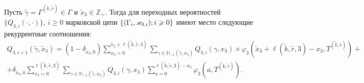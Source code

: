 \documentclass{report}
\newcommand{\MarkThree}{\{(\Gamma_i, \varkappa_{3,i}); \hm{} i \geqslant 0\}}
\begin{document}
\begin{theorem}
Пусть $\tilde{\gamma} =\Gamma^{(\tilde{k},\tilde{r})}\in \Gamma$ и $\tilde{x}_3 \in {\mathbb Z}_+$. Тогда для переходных вероятностей $\{Q_{3,i}(\cdot,\cdot)\}$, ${i\geqslant 0}$ марковской цепи $\MarkThree$ имеют место следующие рекуррентные соотношения:
\begin{multline}
Q_{3,i+1}(\tilde{\gamma},\tilde{x}_3) = (1-\delta_{\tilde{x}_3,0}) \sum_{x_3=0}^{\tilde{x}_3 +  \ell(\tilde{k},\tilde{r},3)}\sum_{\gamma \in {\mathbb H}_{-1}(\tilde{\gamma},x_3)} Q_{3,i}(\gamma,x_3) \times 
\varphi_3(\tilde{x}_3 + \ell(\tilde{k},\tilde{r},3) - x_3,T^{(\tilde{k},\tilde{r})}) + \\
+ \delta_{\tilde{x}_3,0} \sum_{x_3=0}^{\ell(\tilde{k},\tilde{r},3)}\sum_{\gamma \in {\mathbb H}_{-1}(\tilde{\gamma},x_3)} Q_{3,i}(\gamma,x_3) \sum_{a=0}^{\ell(\tilde{k},\tilde{r},3) - x_3} \varphi_3(a,T^{(\tilde{k},\tilde{r})}).
\label{prob:rek}
\end{multline}
\end{theorem}
\end{document}
